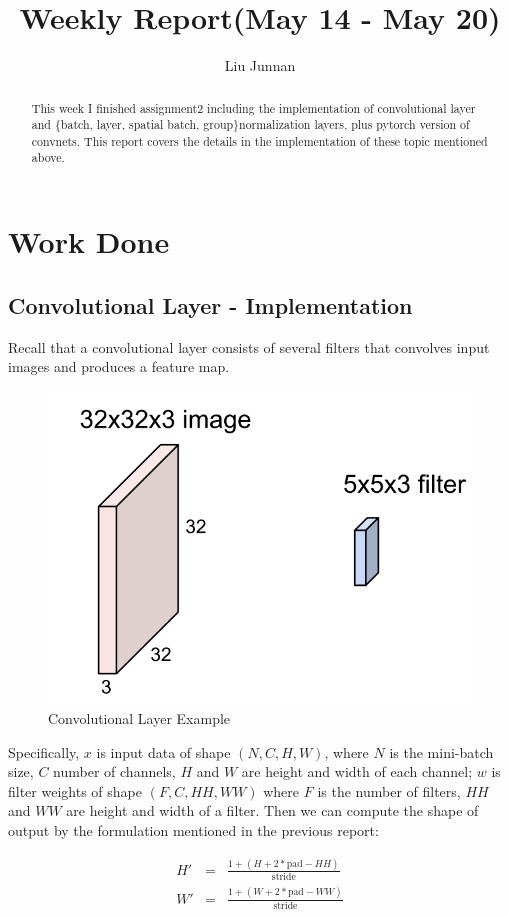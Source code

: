 \documentclass{article} %
\title{Weekly Report(May 14 - May 20)}
\author{
Liu Junnan
}
\begin{document}
	
\maketitle

\begin{abstract}
This week I finished assignment2 including the implementation of convolutional layer and \{batch, layer, spatial batch, group\}normalization layers, plus pytorch version of convnets. This report covers the details in the implementation of these topic mentioned above. 
\end{abstract}

\section{Work Done}
\subsection{Convolutional Layer - Implementation}
Recall that a convolutional layer consists of several filters that convolves input images and produces a feature map.
\begin{figure}[H]
	\centering
	\includegraphics[width=.5\textwidth]{convlayer.png}
	\caption{Convolutional Layer Example}
\end{figure}

Specifically, $x$ is input data of shape $(N, C, H, W)$, where $N$ is the mini-batch size, $C$ number of channels, $H$ and $W$ are height and width of each channel; $w$ is filter weights of shape $(F, C, HH, WW)$ where $F$ is the number of filters, $HH$ and $WW$ are height and width of a filter. Then we can compute the shape of output by the formulation mentioned in the previous report:

\begin{eqnarray*}
H' &=& \frac{1 + (H + 2 * \text{pad} - HH)}{\text{stride}}\\
W' &=& \frac{1 + (W + 2 * \text{pad} - WW)}{\text{stride}}
\end{eqnarray*}
\end{document}
